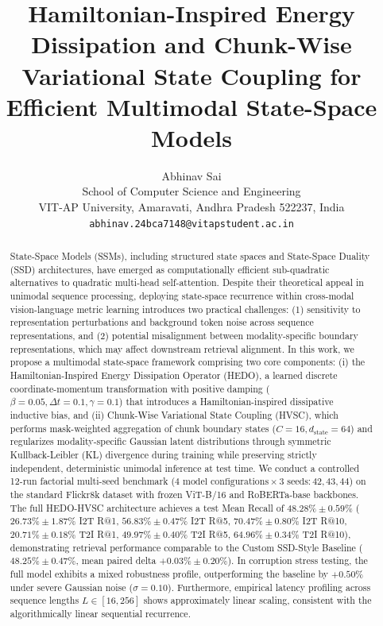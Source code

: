 \documentclass[journal]{IEEEtran}
\begin{document}
\title{Hamiltonian-Inspired Energy Dissipation and Chunk-Wise Variational State Coupling for Efficient Multimodal State-Space Models}

\author{
Abhinav Sai\\
School of Computer Science and Engineering\\
VIT-AP University, Amaravati, Andhra Pradesh 522237, India\\
\texttt{abhinav.24bca7148@vitapstudent.ac.in}
}

\maketitle

\begin{abstract}
State-Space Models (SSMs), including structured state spaces and State-Space Duality (SSD) architectures, have emerged as computationally efficient sub-quadratic alternatives to quadratic multi-head self-attention. Despite their theoretical appeal in unimodal sequence processing, deploying state-space recurrence within cross-modal vision-language metric learning introduces two practical challenges: (1) sensitivity to representation perturbations and background token noise across sequence representations, and (2) potential misalignment between modality-specific boundary representations, which may affect downstream retrieval alignment. In this work, we propose a multimodal state-space framework comprising two core components: (i) the Hamiltonian-Inspired Energy Dissipation Operator (HEDO), a learned discrete coordinate-momentum transformation with positive damping ($\beta=0.05, \Delta t=0.1, \gamma=0.1$) that introduces a Hamiltonian-inspired dissipative inductive bias, and (ii) Chunk-Wise Variational State Coupling (HVSC), which performs mask-weighted aggregation of chunk boundary states ($C=16, d_{\text{state}}=64$) and regularizes modality-specific Gaussian latent distributions through symmetric Kullback-Leibler (KL) divergence during training while preserving strictly independent, deterministic unimodal inference at test time. We conduct a controlled 12-run factorial multi-seed benchmark ($4\text{ model configurations} \times 3\text{ seeds}: 42, 43, 44$) on the standard Flickr8k dataset with frozen ViT-B/16 and RoBERTa-base backbones. The full HEDO-HVSC architecture achieves a test Mean Recall of $48.28\% \pm 0.59\%$ ($26.73\% \pm 1.87\%$ I2T R@1, $56.83\% \pm 0.47\%$ I2T R@5, $70.47\% \pm 0.80\%$ I2T R@10, $20.71\% \pm 0.18\%$ T2I R@1, $49.97\% \pm 0.40\%$ T2I R@5, $64.96\% \pm 0.34\%$ T2I R@10), demonstrating retrieval performance comparable to the Custom SSD-Style Baseline ($48.25\% \pm 0.47\%$, mean paired delta $+0.03\% \pm 0.20\%$). In corruption stress testing, the full model exhibits a mixed robustness profile, outperforming the baseline by $+0.50\%$ under severe Gaussian noise ($\sigma=0.10$). Furthermore, empirical latency profiling across sequence lengths $L \in [16, 256]$ shows approximately linear scaling, consistent with the algorithmically linear sequential recurrence.
\end{abstract}
\end{document}
